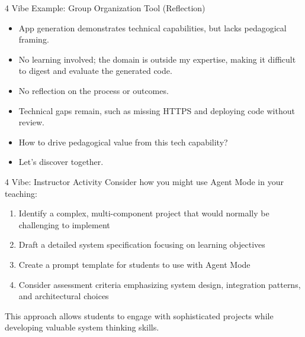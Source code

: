 \documentclass[xcolor={dvipsnames,table}, aspectratio=169]{beamer}
\begin{document}
\begin{frame}{4 Vibe Example: Group Organization Tool (Reflection)}
\begin{itemize}
  \item App generation demonstrates technical capabilities, but lacks pedagogical framing.
  \item No learning involved; the domain is outside my expertise, making it difficult to digest and evaluate the generated code.
  \item No reflection on the process or outcomes.
  \item Technical gaps remain, such as missing HTTPS and deploying code without review.
\end{itemize}

\begin{alertbox}
\begin{itemize}
  \item How to drive pedagogical value from this tech capability? 
  \item Let's discover together.
\end{itemize}  
\end{alertbox}
\end{frame}

\begin{frame}{4 Vibe: Instructor Activity}
  Consider how you might use Agent Mode in your teaching:
  
  \begin{enumerate}
    \item Identify a complex, multi-component project that would normally be challenging to implement
    \item Draft a detailed system specification focusing on learning objectives
    \item Create a prompt template for students to use with Agent Mode
    \item Consider assessment criteria emphasizing system design, integration patterns, and architectural choices
  \end{enumerate}
  
  This approach allows students to engage with sophisticated projects while developing valuable system thinking skills.
\end{frame}
\end{document}
